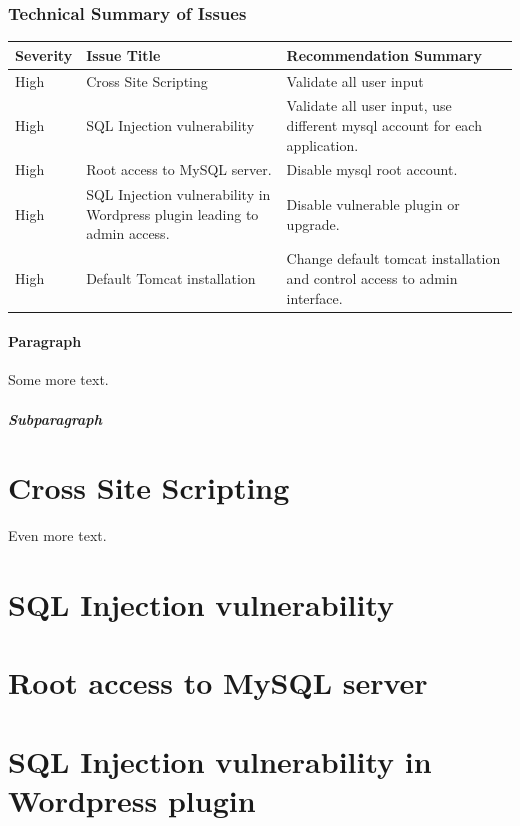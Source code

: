 \documentclass{article}
\begin{document}
\subsubsection{Technical Summary of Issues}

\begin{center}
  \begin{tabular}{| l | l | | l |}
    \hline
    \textbf{Severity} & \textbf{Issue Title} & \textbf{Recommendation Summary} \\ \hline \hline
    High & Cross Site Scripting & Validate all user input \\ \hline
    High & SQL Injection vulnerability & Validate all user input, use different mysql account for each application. \\ \hline
    High & Root access to MySQL server. & Disable mysql root account. \\ \hline
    High & SQL Injection vulnerability in Wordpress plugin leading to admin access. & Disable vulnerable plugin or upgrade. \\ \hline
    High & Default Tomcat installation & Change default tomcat installation and control access to admin interface. \\ \hline
    \hline
  \end{tabular}
\end{center}

\paragraph{Paragraph}

Some more text.

\subparagraph{Subparagraph}

\newpage
\section{Cross Site Scripting}

Even more text.

\newpage
\section{SQL Injection vulnerability}
\newpage
\section{Root access to MySQL server}
\newpage
\section{SQL Injection vulnerability in Wordpress plugin}
\newpage
\end{document}
